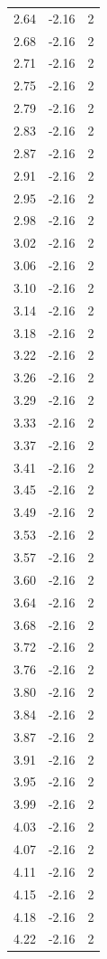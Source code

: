 \begin{longtable}{lrr}
  2.64 & -2.16 & 2 \\
  2.68 & -2.16 & 2 \\
  2.71 & -2.16 & 2 \\
  2.75 & -2.16 & 2 \\
  2.79 & -2.16 & 2 \\
  2.83 & -2.16 & 2 \\
  2.87 & -2.16 & 2 \\
  2.91 & -2.16 & 2 \\
  2.95 & -2.16 & 2 \\
  2.98 & -2.16 & 2 \\
  3.02 & -2.16 & 2 \\
  3.06 & -2.16 & 2 \\
  3.10 & -2.16 & 2 \\
  3.14 & -2.16 & 2 \\
  3.18 & -2.16 & 2 \\
  3.22 & -2.16 & 2 \\
  3.26 & -2.16 & 2 \\
  3.29 & -2.16 & 2 \\
  3.33 & -2.16 & 2 \\
  3.37 & -2.16 & 2 \\
  3.41 & -2.16 & 2 \\
  3.45 & -2.16 & 2 \\
  3.49 & -2.16 & 2 \\
  3.53 & -2.16 & 2 \\
  3.57 & -2.16 & 2 \\
  3.60 & -2.16 & 2 \\
  3.64 & -2.16 & 2 \\
  3.68 & -2.16 & 2 \\
  3.72 & -2.16 & 2 \\
  3.76 & -2.16 & 2 \\
  3.80 & -2.16 & 2 \\
  3.84 & -2.16 & 2 \\
  3.87 & -2.16 & 2 \\
  3.91 & -2.16 & 2 \\
  3.95 & -2.16 & 2 \\
  3.99 & -2.16 & 2 \\
  4.03 & -2.16 & 2 \\
  4.07 & -2.16 & 2 \\
  4.11 & -2.16 & 2 \\
  4.15 & -2.16 & 2 \\
  4.18 & -2.16 & 2 \\
  4.22 & -2.16 & 2 \\

\end{longtable}
